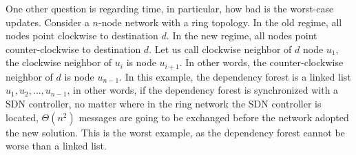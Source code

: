 One other question is regarding time, in particular, how bad is the worst-case updates. Consider a $n$-node network with a ring topology. In the old regime, all nodes point clockwise to destination $d$. In the new regime, all nodes point counter-clockwise to destination $d$. Let us call clockwise neighbor of $d$ node $u_1$, the clockwise neighbor of $u_i$ is node $u_{i+1}$. In other words, the counter-clockwise neighbor of $d$ is node $u_{n-1}$. In this example, the dependency forest is a linked list $u_1,u_2,\ldots,u_{n-1}$, in other words, if the dependency forest is synchronized with a SDN controller, no matter where in the ring network the SDN controller is located, $\Theta(n^2)$ messages are going to be exchanged before the network adopted the new solution. This is the worst example, as the dependency forest cannot be worse than a linked list.

